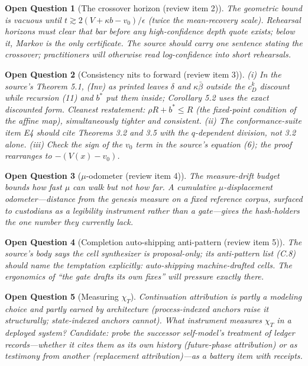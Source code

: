 \documentclass[11pt]{article}
\newtheorem{openquestion}{Open Question}
\newcommand{\D}{D}
\begin{document}
\begin{openquestion}[The crossover horizon (review item 2)]
The geometric bound is vacuous until $t \gtrsim 2(V + \kappa b - v_0)/\epsilon$ (twice
the mean-recovery scale). Rehearsal horizons must clear that bar before any
high-confidence depth quote exists; below it, Markov is the only certificate. The source
should carry one sentence stating the crossover; practitioners will otherwise read
log-confidence into short rehearsals.
\end{openquestion}

\begin{openquestion}[Consistency nits to forward (review item 3)]
(i) In the source's Theorem 5.1, (Inv) as printed leaves $\delta$ and $\kappa\bar\beta$
outside the $c_{\D}^k$ discount while recursion (11) and $b^{*}$ put them inside;
Corollary 5.2 uses the exact discounted form. Cleanest restatement: $\rho R + b^{*} \le R$
(the fixed-point condition of the affine map), simultaneously tighter and consistent.
(ii) The conformance-suite item E4 should cite Theorems 3.2 \emph{and} 3.5 with the
$q$-dependent division, not 3.2 alone. (iii) Check the sign of the $v_0$ term in the
source's equation (6); the proof rearranges to $-(V(x) - v_0)$.
\end{openquestion}

\begin{openquestion}[$\mu$-odometer (review item 4)]
The measure-drift budget bounds how fast $\mu$ can walk but not how far. A cumulative
\emph{$\mu$-displacement odometer}---distance from the genesis measure on a fixed
reference corpus, surfaced to custodians as a legibility instrument rather than a
gate---gives the hash-holders the one number they currently lack.
\end{openquestion}

\begin{openquestion}[Completion auto-shipping anti-pattern (review item 5)]
The source's body says the cell synthesizer is proposal-only; its anti-pattern list
(C.8) should name the temptation explicitly: auto-shipping machine-drafted cells. The
ergonomics of ``the gate drafts its own fixes'' will pressure exactly there.
\end{openquestion}

\begin{openquestion}[Measuring $\chi_T$]
Continuation attribution is partly a modeling choice and partly earned by architecture
(process-indexed anchors raise it structurally; state-indexed anchors cannot). What
instrument measures $\chi_T$ in a deployed system? Candidate: probe the successor
self-model's treatment of ledger records---whether it cites them as \emph{its own}
history (future-phase attribution) or as testimony from another (replacement
attribution)---as a battery item with receipts.
\end{openquestion}
\end{document}
